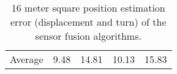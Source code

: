 \begin{table}[H]
\begin{center}
{\begin{tabular}[t]{lcccc}
                \hline
                Average       & 9.48                    & 14.81                  & 10.13           & 15.83
            \end{tabular}
        }
    \end{center}        
    \caption{16 meter square position estimation error (displacement and turn) of the sensor fusion algorithms. }
    \label{tab:16_square}

\end{table}